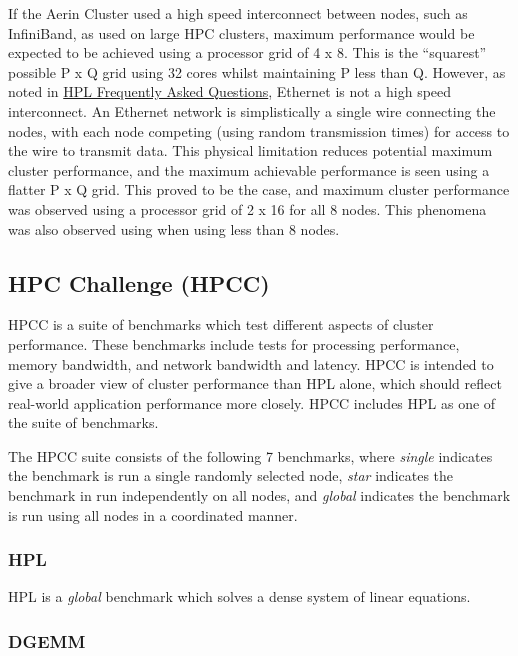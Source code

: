 If the Aerin Cluster used a high speed interconnect between nodes, such as InfiniBand, as used on large HPC clusters, maximum performance would be expected to be achieved using a processor grid of 4 x 8. This is the ``squarest'' possible P x Q grid using 32 cores whilst maintaining P less than Q. However, as noted in \href{https://www.netlib.org/benchmark/hpl/faqs.html}{HPL Frequently Asked Questions}, Ethernet is not a high speed interconnect. An Ethernet network is simplistically a single wire connecting the nodes, with each node competing (using random transmission times) for access to the wire to transmit data. This physical limitation reduces potential maximum cluster performance, and the maximum achievable performance is seen using a flatter P x Q grid. This proved to be the case, and maximum cluster performance was observed using a processor grid of 2 x 16 for all 8 nodes. This phenomena was also observed using when using less than 8 nodes.


%
%
\subsection{HPC Challenge (HPCC)}

HPCC is a suite of benchmarks which test different aspects of cluster performance. These benchmarks include tests for processing performance, memory bandwidth, and network bandwidth and latency. HPCC is intended to give a broader view of cluster performance than HPL alone, which should reflect real-world application performance more closely. HPCC includes HPL as one of the suite of benchmarks.

The HPCC suite consists of the following 7 benchmarks, where \emph{single} indicates the benchmark is run a single randomly selected node, \emph{star} indicates the benchmark in run independently on all nodes, and \emph{global} indicates the benchmark is run using all nodes in a coordinated manner. 


%
%
\subsubsection{HPL}

HPL is a \emph{global} benchmark which solves a dense system of linear equations.


%
%
\subsubsection{DGEMM}

